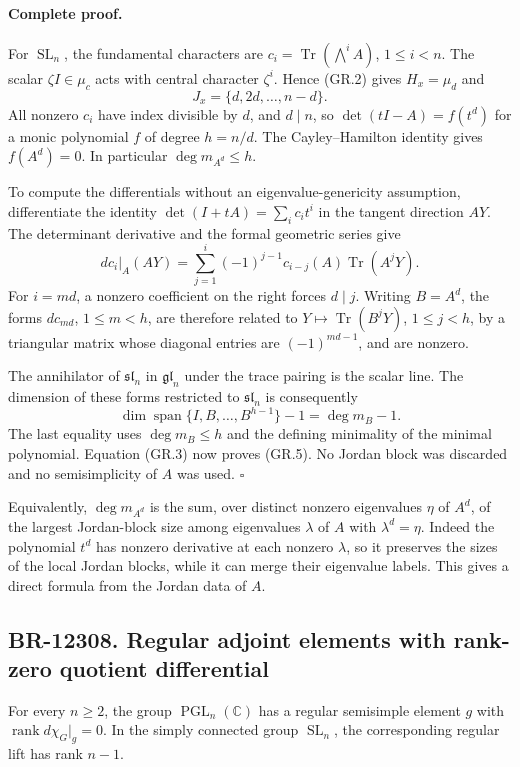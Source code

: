 \documentclass[11pt,a4paper]{article}
\theoremstyle{definition}\newtheorem{definition}[theorem]{Definition}
\theoremstyle{remark}\newtheorem{remark}[theorem]{Remark}
\begin{document}
\paragraph{Complete proof.}
For $\operatorname{SL}_n$, the fundamental characters are
$c_i=\operatorname{Tr}(\bigwedge^i A)$, $1\leq i<n$.
The scalar $\zeta I\in\mu_c$ acts with central character
$\zeta^i$.  Hence (GR.2) gives $H_x=\mu_d$ and
\[
 J_x=\{d,2d,\ldots,n-d\}.
\]
All nonzero $c_i$ have index divisible by $d$, and $d\mid n$,
so $\det(tI-A)=f(t^d)$ for a monic polynomial $f$ of degree
$h=n/d$.  The Cayley--Hamilton identity gives $f(A^d)=0$.
In particular $\deg m_{A^d}\leq h$.

To compute the differentials without an eigenvalue-genericity
assumption, differentiate the identity
$\det(I+tA)=\sum_i c_i t^i$ in the tangent direction $AY$.
The determinant derivative and the formal geometric series give
\[
 dc_i|_A(AY)=\sum_{j=1}^{i}(-1)^{j-1}c_{i-j}(A)
                                  \operatorname{Tr}(A^jY).
 \tag{GR.6}
\]
For $i=md$, a nonzero coefficient on the right forces $d\mid j$.
Writing $B=A^d$, the forms $dc_{md}$, $1\leq m<h$, are
therefore related to
$Y\mapsto\operatorname{Tr}(B^jY)$, $1\leq j<h$, by a
triangular matrix whose diagonal entries are
$(-1)^{md-1}$, and are nonzero.

The annihilator of $\mathfrak{sl}_n$ in
$\mathfrak{gl}_n$ under the trace pairing is the scalar line.
The dimension of these forms restricted to $\mathfrak{sl}_n$
is consequently
\[
 \dim\operatorname{span}\{I,B,\ldots,B^{h-1}\}-1
 =\deg m_B-1.
\]
The last equality uses $\deg m_B\leq h$ and the defining
minimality of the minimal polynomial.  Equation (GR.3) now
proves (GR.5).  No Jordan block was discarded and no
semisimplicity of $A$ was used. \(\square\)

Equivalently, $\deg m_{A^d}$ is the sum, over distinct nonzero
eigenvalues $\eta$ of $A^d$, of the largest Jordan-block size
among eigenvalues $\lambda$ of $A$ with $\lambda^d=\eta$.
Indeed the polynomial $t^d$ has nonzero derivative at each
nonzero $\lambda$, so it preserves the sizes of the local
Jordan blocks, while it can merge their eigenvalue labels.
This gives a direct formula from the Jordan data of $A$.

\subsection{BR-12308. Regular adjoint elements with rank-zero quotient differential}
For every $n\geq2$, the group $\operatorname{PGL}_n(\mathbb C)$
has a regular semisimple element $g$ with
$\operatorname{rank}d\chi_G|_g=0$.
In the simply connected group $\operatorname{SL}_n$, the
corresponding regular lift has rank $n-1$.
\end{document}
